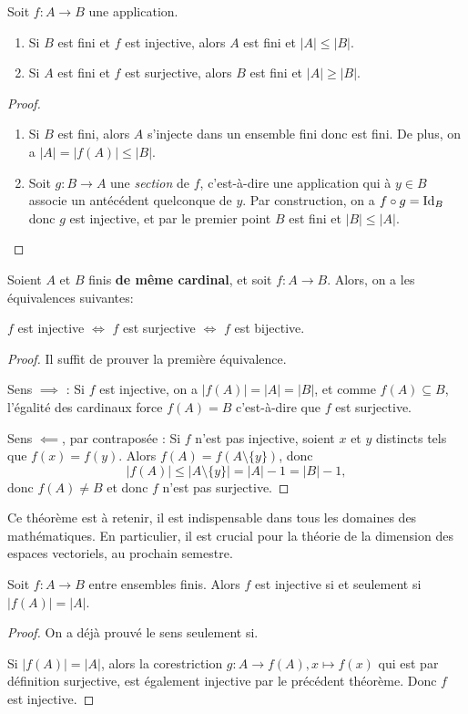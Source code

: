 \begin{proposition}
Soit $f : A\to B$ une application.
\begin{enumerate}
\item Si $B$ est fini et $f$ est injective, alors $A$ est fini et $|A|\leq |B|$.
\item Si $A$ est fini et $f$ est surjective, alors $B$ est fini et $|A|\geq |B|$.
\end{enumerate}
\end{proposition}
\begin{proof}
\begin{enumerate}
\item Si $B$ est fini, alors $A$ s'injecte dans un ensemble fini donc est fini. De plus, on a $|A|=|f(A)|\leq |B|$.
\item Soit $g:B\to A$ une \emph{section} de $f$, c'est-à-dire une application  qui à $y\in B$ associe un antécédent quelconque de $y$. Par construction, on a $f\circ g=\operatorname{Id}_{B}$ donc $g$ est injective, et par le premier point $B$ est fini et $|B| \leq |A|$.
\end{enumerate}
\end{proof}

\begin{theoreme}[IMPORTANT]
Soient $A$ et $B$ finis \textbf{de même cardinal}, et soit $f : A\to B$. Alors, on a les équivalences suivantes:
\begin{center}
$f$ est injective $\iff$ $f$ est surjective $\iff$ $f$ est  bijective.
\end{center}
\end{theoreme}
\begin{proof}
Il suffit de prouver la première équivalence.

Sens $\implies$ : Si $f$ est injective, on a $|f(A)|=|A|=|B|$, et comme $f(A)\subseteq B$, l'égalité des cardinaux force $f(A)=B$ c'est-à-dire que $f$ est surjective.

Sens $\impliedby$, par contraposée : Si $f$ n'est pas injective, soient $x$ et $y$ distincts tels que $f(x)=f(y)$. Alors $f(A) = f(A\setminus \{y\})$, donc 
\[
|f(A)| \leq |A\setminus \{y\}| = |A|-1 = |B|-1,
\]
donc $f(A) \neq B$ et donc $f$ n'est pas surjective.
\end{proof}

Ce théorème est à retenir, il est indispensable dans tous les domaines des mathématiques. En particulier, il est crucial pour la théorie de la dimension des espaces vectoriels, au prochain semestre.

\begin{corollaire}
Soit $f : A\to B$ entre ensembles finis. Alors $f$ est injective si et seulement si $|f(A)|=|A|$.
\end{corollaire}
\begin{proof}On a déjà prouvé le sens \og seulement si\fg.

Si $|f(A)|=|A|$, alors la corestriction $g : A\to f(A), x\mapsto f(x)$ qui est par définition surjective, est également injective par le précédent théorème. Donc $f$ est injective.
\end{proof}



